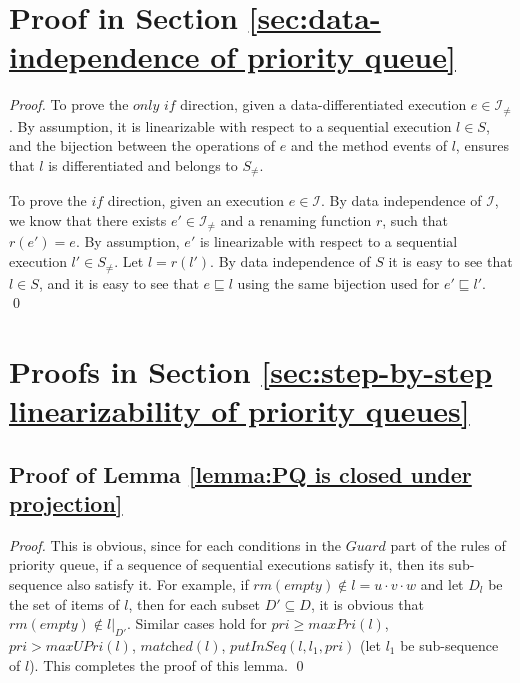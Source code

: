 \section{Proof in Section \ref{sec:data-independence of priority queue}}
\label{sec:appendix in section data-independence of PQ}


\DataDifferentiatedisEnoughforPQ*

\begin {proof}

To prove the $\textit{only if}$ direction, given a data-differentiated execution $e \in \mathcal{I}_{\neq}$. By assumption, it is linearizable with respect to a sequential execution $l \in S$, and the bijection between the operations of $e$ and the method events of $l$, ensures that $l$ is differentiated and belongs to $S_{\neq}$.

To prove the $\textit{if}$ direction, given an execution $e \in \mathcal{I}$. By data independence of $\mathcal{I}$, we know that there exists $e' \in \mathcal{I}_{\neq}$ and a renaming function $r$, such that $r(e') = e$. By assumption, $e'$ is linearizable with respect to a sequential execution $l' \in S_{\neq}$. Let $l=r(l')$. By data independence of $S$ it is easy to see that $l \in S$, and it is easy to see that $e \sqsubseteq l$  using the same bijection used for $e' \sqsubseteq l'$. \qed
\end {proof}





\section{Proofs in Section \ref{sec:step-by-step linearizability of priority queues}}
\label{sec:appendix in section step-by-step linearizability of priority queues}


\subsection{Proof of Lemma \ref{lemma:PQ is closed under projection}}

\PQisClosedUnderProjection*

\begin {proof}

This is obvious, since for each conditions in the $\textit{Guard}$ part of the rules of priority queue, if a sequence of sequential executions satisfy it, then its sub-sequence also satisfy it. For example, if $\textit{rm}(\textit{empty}) \notin l = u \cdot v \cdot w$ and let $D_l$ be the set of items of $l$, then for each subset $D' \subseteq D$, it is obvious that $\textit{rm}(\textit{empty}) \notin l \vert_{ D' }$. Similar cases hold for $\textit{pri} \geq \textit{maxPri}(l)$, $\textit{pri} > \textit{maxUPri}(l)$, $\textit{matched}(l)$, $\textit{putInSeq}(l,l_1,\textit{pri})$ (let $l_1$ be sub-sequence of $l$). This completes the proof of this lemma. \qed
\end {proof}


